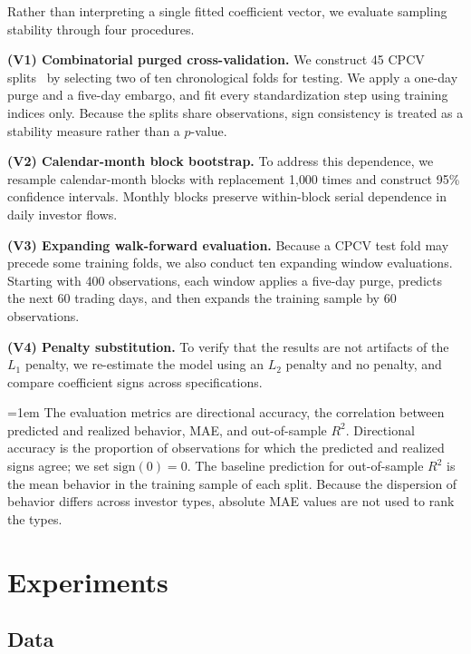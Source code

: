 Rather than interpreting a single fitted coefficient vector, we evaluate sampling stability
through four procedures.

\textbf{(V1) Combinatorial purged cross-validation.}
We construct 45 CPCV splits~\cite{lopez2018advances} by selecting two of ten chronological
folds for testing. We apply a one-day purge and a five-day embargo, and
fit every standardization step using training indices only. Because the splits share
observations, sign consistency is treated as a stability measure rather than a $p$-value.

\textbf{(V2) Calendar-month block bootstrap.}
To address this dependence, we resample calendar-month blocks with replacement 1{,}000 times
and construct 95\% confidence intervals. Monthly blocks preserve within-block serial
dependence in daily investor flows.

\textbf{(V3) Expanding walk-forward evaluation.}
Because a CPCV test fold may precede some training folds, we also conduct ten expanding window
evaluations. Starting with 400 observations, each window applies a five-day purge, predicts
the next 60 trading days, and then expands the training sample by 60 observations.

\textbf{(V4) Penalty substitution.}
To verify that the results are not artifacts of the $L_1$ penalty, we re-estimate the model
using an $L_2$ penalty and no penalty, and compare coefficient signs across specifications.

{\emergencystretch=1em
The evaluation metrics are directional accuracy, the correlation between predicted and
realized behavior, MAE, and out-of-sample $R^2$. Directional accuracy is the proportion of
observations for which the predicted and realized signs agree; we set $\mathrm{sign}(0)=0$.
The baseline prediction
for out-of-sample $R^2$ is the mean behavior in the training sample of each split. Because
the dispersion of behavior differs across investor types, absolute MAE values are not used
to rank the types.
}

\section{Experiments}
\label{sec:experiments}

\subsection{Data}
\label{sec:data}

